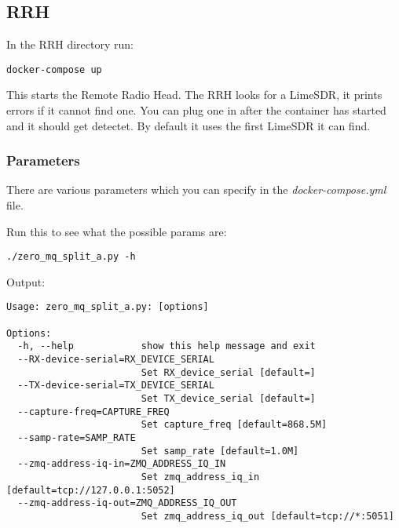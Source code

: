 \subsection{RRH}\label{rrh}

In the RRH directory run:

\begin{verbatim}
docker-compose up 
\end{verbatim}

This starts the Remote Radio Head. The RRH looks for a LimeSDR, it
prints errors if it cannot find one. You can plug one in after the
container has started and it should get detectet. By default it uses the
first LimeSDR it can find.

\subsubsection{Parameters}\label{parameters}

There are various parameters which you can specify in the
\emph{docker-compose.yml} file.

Run this to see what the possible params are:

\begin{verbatim}
./zero_mq_split_a.py -h
\end{verbatim}

Output:

\begin{verbatim}
Usage: zero_mq_split_a.py: [options]

Options:
  -h, --help            show this help message and exit
  --RX-device-serial=RX_DEVICE_SERIAL
                        Set RX_device_serial [default=]
  --TX-device-serial=TX_DEVICE_SERIAL
                        Set TX_device_serial [default=]
  --capture-freq=CAPTURE_FREQ
                        Set capture_freq [default=868.5M]
  --samp-rate=SAMP_RATE
                        Set samp_rate [default=1.0M]
  --zmq-address-iq-in=ZMQ_ADDRESS_IQ_IN
                        Set zmq_address_iq_in [default=tcp://127.0.0.1:5052]
  --zmq-address-iq-out=ZMQ_ADDRESS_IQ_OUT
                        Set zmq_address_iq_out [default=tcp://*:5051]
\end{verbatim}

